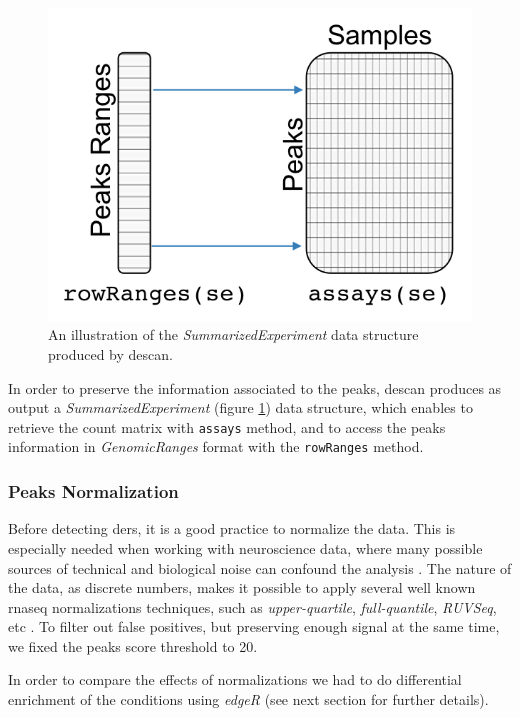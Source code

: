 \begin{figure}[H]
\centering
\includegraphics[scale=.7]{img/descan2/counts.png}
\caption[DEScan2 counts illustration]{An illustration of the \textit{SummarizedExperiment} data structure produced by \gls{descan}.}
\label{fig:countsdescan}
\centering
\end{figure}

In order to preserve the information associated to the peaks, \gls{descan} produces as output a \textit{SummarizedExperiment} (figure \ref{fig:countsdescan}) data structure, which enables to retrieve the count matrix with \lstinline!assays! method, and to access the peaks information in \textit{GenomicRanges} format with the \lstinline!rowRanges! method.


\subsubsection{Peaks Normalization}

Before detecting \glspl{der}, it is a good practice to normalize the data.
This is especially needed when working with neuroscience data, where many possible sources of technical and biological noise can confound the analysis \cite{Peixoto2015}.
The nature of the data, as discrete numbers, makes it possible to apply several well known \gls{rnaseq} normalizations techniques, such as \textit{upper-quartile}, \textit{full-quantile}, \textit{RUVSeq}, etc \cite{Risso2014h, Dillies2013}.
To filter out false positives, but preserving enough signal at the same time, we fixed the peaks score threshold to 20.

In order to compare the effects of normalizations we had to do differential enrichment of the conditions using \textit{edgeR} (see next section for further details).

